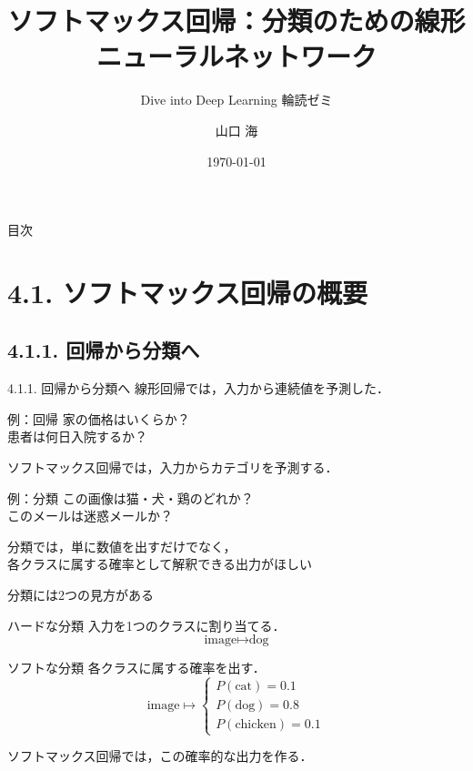 \documentclass[dvipdfmx,uplatex,11pt]{beamer}
\title{ソフトマックス回帰：分類のための線形ニューラルネットワーク}
\subtitle{Dive into Deep Learning 輪読ゼミ}
\author{山口 海}
\date{\today}
\begin{document}
\maketitle

\begin{frame}[allowframebreaks]{目次}
  \tableofcontents[
    sectionstyle=show,
    subsectionstyle=show/show/show
  ]
\end{frame}


\section{4.1. ソフトマックス回帰の概要}
\subsection{4.1.1. 回帰から分類へ}
\begin{frame}{4.1.1. 回帰から分類へ}
線形回帰では，入力から\alert{連続値}を予測した．

\begin{block}{例：回帰}
家の価格はいくらか？\\
患者は何日入院するか？
\end{block}

ソフトマックス回帰では，入力から\alert{カテゴリ}を予測する．

\begin{block}{例：分類}
この画像は猫・犬・鶏のどれか？\\
このメールは迷惑メールか？
\end{block}
\begin{d2lplainbox}
  分類では，単に数値を出すだけでなく，\\
\alert{各クラスに属する確率}として解釈できる出力がほしい
\end{d2lplainbox}
\end{frame}


\begin{frame}{分類には2つの見方がある}
\begin{block}{ハードな分類}
入力を1つのクラスに割り当てる．
\[
  \text{image} \longmapsto \text{dog}
\]
\end{block}

\begin{block}{ソフトな分類}
各クラスに属する確率を出す．
\[
  \text{image} \longmapsto
  \begin{cases}
    P(\text{cat}) = 0.1\\
    P(\text{dog}) = 0.8\\
    P(\text{chicken}) = 0.1
  \end{cases}
\]
\end{block}

\vspace{0.5em}
\centering
ソフトマックス回帰では，この\alert{確率的な出力}を作る．
\end{frame}
\end{document}
